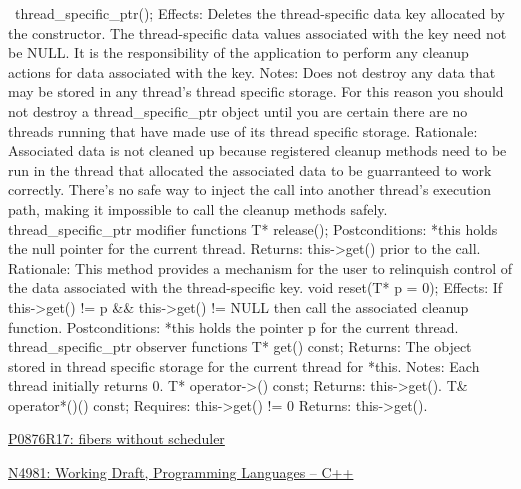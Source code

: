 \documentclass[fontsize=10pt,paper=A4,pagesize,DIV=15]{scrartcl}
\begin{document}
~thread_specific_ptr();
Effects:	Deletes the thread-specific data key allocated by the constructor. The thread-specific data values associated with the key need not be NULL. It is the responsibility of the application to perform any cleanup actions for data associated with the key.
Notes:	Does not destroy any data that may be stored in any thread's thread specific storage. For this reason you should not destroy a thread_specific_ptr object until you are certain there are no threads running that have made use of its thread specific storage.
Rationale:	Associated data is not cleaned up because registered cleanup methods need to be run in the thread that allocated the associated data to be guarranteed to work correctly. There's no safe way to inject the call into another thread's execution path, making it impossible to call the cleanup methods safely.
thread_specific_ptr modifier functions
T* release();
Postconditions:	*this holds the null pointer for the current thread.
Returns:	this->get() prior to the call.
Rationale:	This method provides a mechanism for the user to relinquish control of the data associated with the thread-specific key.
void reset(T* p = 0);
Effects:	If this->get() != p && this->get() != NULL then call the associated cleanup function.
Postconditions:	*this holds the pointer p for the current thread.
thread_specific_ptr observer functions
T* get() const;
Returns:	The object stored in thread specific storage for the current thread for *this.
Notes:	Each thread initially returns 0.
T* operator->() const;
Returns:	this->get().
T& operator*()() const;
Requires:	this->get() != 0
Returns:	this->get().

\cbend


\newpage
{}
\begin{thebibliography}{99}

        \href{https://www.open-std.org/jtc1/sc22/wg21/docs/papers/2024/p0876r17.pdf}
        {P0876R17: fibers without scheduler}

        \href{https://www.open-std.org/jtc1/sc22/wg21/docs/papers/2024/n4981.pdf}
        {N4981: Working Draft, Programming Languages -- C++}

\end{thebibliography}

\end{document}
